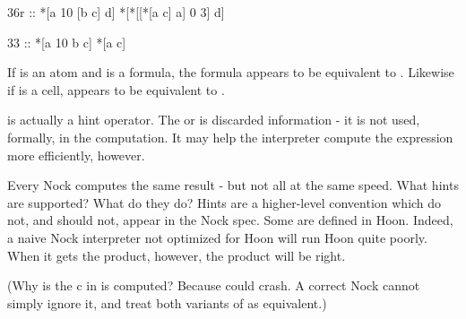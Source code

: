\begin{code}
36r ::    *[a 10 [b c] d]   *[*[[*[a c] a] 0 3] d]

33 ::    *[a 10 b c]       *[a c]
\end{code}
If  is an atom and  is a formula, the formula \kode{[10 b c]} appears to be
equivalent to . Likewise if \kode{[b c]} is a cell, \kode{[10 [b c] d]} appears to be
equivalent to .

 is actually a hint operator.  The  or \kode{[b c]}is discarded information -
it is not used, formally, in the computation.  It may help the interpreter
compute the expression more efficiently, however.

Every Nock computes the same result - but not all at the same speed.  What
hints are supported?  What do they do?  Hints are a higher-level convention
which do not, and should not, appear in the Nock spec.  Some are defined in
Hoon.  Indeed, a naive Nock interpreter not optimized for Hoon will run Hoon
quite poorly.  When it gets the product, however, the product will be right.

(Why is the c in \kode{[b c]} is computed?  Because  could crash.  A correct
Nock cannot simply ignore it, and treat both variants of  as equivalent.)